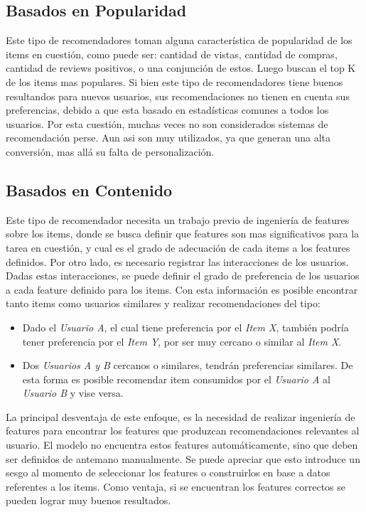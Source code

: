 \documentclass[11pt,a4paper,twoside]{thesis}
\begin{document}
\subsection{Basados en Popularidad} 

Este tipo de recomendadores toman alguna característica de popularidad de los items en cuestión, como puede ser: cantidad de vistas, cantidad de compras, cantidad de reviews positivos, o una conjunción de estos. Luego buscan el top K de los items mas populares. Si bien este tipo de recomendadores tiene buenos resultandos para nuevos usuarios, sus recomendaciones no tienen en cuenta sus preferencias, debido a que esta basado en estadísticas comunes a todos los usuarios. Por esta cuestión, muchas veces no son considerados sistemas de recomendación perse. Aun asi son muy utilizados, ya que generan una alta conversión, mas allá su falta de personalización.

\subsection{Basados en Contenido}

Este tipo de recomendador necesita un trabajo previo de ingeniería de features sobre los items, donde se busca definir que features son mas significativos para la tarea en cuestión, y cual es el grado de adecuación de cada items a los features definidos. Por otro lado, es necesario registrar las interacciones de los usuarios. Dadas estas interacciones, se puede definir el grado de preferencia de los usuarios a cada feature definido para los items. Con esta información es posible encontrar tanto items como usuarios similares y realizar recomendaciones del tipo:

\begin{itemize}
\item Dado el \textit{Usuario A}, el cual tiene preferencia por el \textit{Item X}, también podría tener preferencia por el \textit{Item Y}, por ser muy cercano o similar al \textit{Item X}.
\item Dos \textit{Usuarios A y B} cercanos o similares, tendrán preferencias similares. De esta forma es posible recomendar item consumidos por el \textit{Usuario A} al \textit{Usuario B} y vise versa. 
\end{itemize}
	
La principal desventaja de este enfoque, es la necesidad de realizar ingeniería de features para encontrar los features que produzcan recomendaciones relevantes al usuario. El modelo no encuentra estos features automáticamente, sino que deben ser definidos de antemano manualmente. Se puede apreciar que esto introduce un sesgo al momento de seleccionar los features o construirlos en base a datos referentes a los items. Como ventaja, si se encuentran los features correctos se pueden lograr muy buenos resultados.
\end{document}
